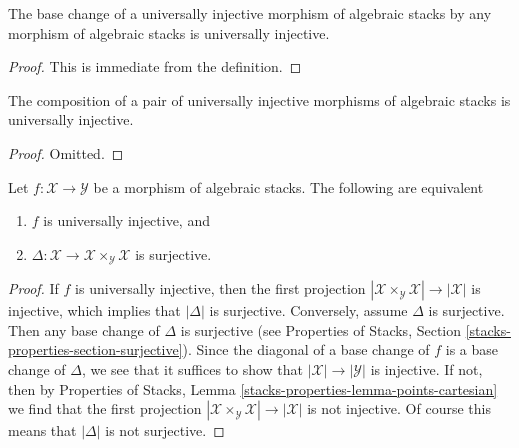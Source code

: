\begin{lemma}
\label{lemma-base-change-universally-injective}
The base change of a universally injective morphism of algebraic stacks
by any morphism of algebraic stacks is universally injective.
\end{lemma}

\begin{proof}
This is immediate from the definition.
\end{proof}

\begin{lemma}
\label{lemma-composition-universally-injective}
The composition of a pair of universally injective morphisms of
algebraic stacks is universally injective.
\end{lemma}

\begin{proof}
Omitted.
\end{proof}

\begin{lemma}
\label{lemma-universally-injective}
Let $f : \mathcal{X} \to \mathcal{Y}$ be a morphism of algebraic stacks.
The following are equivalent
\begin{enumerate}
\item $f$ is universally injective, and
\item $\Delta : \mathcal{X} \to \mathcal{X} \times_\mathcal{Y} \mathcal{X}$
is surjective.
\end{enumerate}
\end{lemma}

\begin{proof}
If $f$ is universally injective, then the first projection
$|\mathcal{X} \times_\mathcal{Y} \mathcal{X}| \to |\mathcal{X}|$
is injective, which implies that $|\Delta|$ is surjective.
Conversely, assume $\Delta$ is surjective. Then any base change
of $\Delta$ is surjective (see Properties of Stacks, Section
\ref{stacks-properties-section-surjective}).
Since the diagonal of a base change
of $f$ is a base change of $\Delta$, we see that it suffices
to show that $|\mathcal{X}| \to |\mathcal{Y}|$ is injective.
If not, then by Properties of Stacks, Lemma
\ref{stacks-properties-lemma-points-cartesian}
we find that the first projection
$|\mathcal{X} \times_\mathcal{Y} \mathcal{X}| \to |\mathcal{X}|$
is not injective. Of course this means that $|\Delta|$ is not
surjective.
\end{proof}









